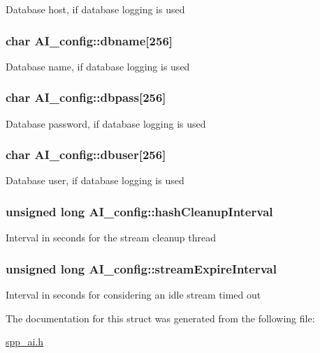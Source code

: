 \label{structAI__config_a8e56f1a1b2095d3d329c8068ea0f3aab}
Database host, if database logging is used \hypertarget{structAI__config_ac8a93607f12106e2f5c9b43af27107da}{
\subsubsection[{dbname}]{\setlength{\rightskip}{0pt plus 5cm}char {\bf AI\_\-config::dbname}\mbox{[}256\mbox{]}}}
\label{structAI__config_ac8a93607f12106e2f5c9b43af27107da}
Database name, if database logging is used \hypertarget{structAI__config_aa1cda349763faf60b2ebdbf2d187ae7d}{
\subsubsection[{dbpass}]{\setlength{\rightskip}{0pt plus 5cm}char {\bf AI\_\-config::dbpass}\mbox{[}256\mbox{]}}}
\label{structAI__config_aa1cda349763faf60b2ebdbf2d187ae7d}
Database password, if database logging is used \hypertarget{structAI__config_aa004adebfdafb6d14092aecd7f4912b0}{
\subsubsection[{dbuser}]{\setlength{\rightskip}{0pt plus 5cm}char {\bf AI\_\-config::dbuser}\mbox{[}256\mbox{]}}}
\label{structAI__config_aa004adebfdafb6d14092aecd7f4912b0}
Database user, if database logging is used \hypertarget{structAI__config_a9f7680615027d4fb74b4aa144a7028a4}{
\subsubsection[{hashCleanupInterval}]{\setlength{\rightskip}{0pt plus 5cm}unsigned long {\bf AI\_\-config::hashCleanupInterval}}}
\label{structAI__config_a9f7680615027d4fb74b4aa144a7028a4}
Interval in seconds for the stream cleanup thread \hypertarget{structAI__config_abbe77d5f94b8c5164bea47acba09c98b}{
\subsubsection[{streamExpireInterval}]{\setlength{\rightskip}{0pt plus 5cm}unsigned long {\bf AI\_\-config::streamExpireInterval}}}
\label{structAI__config_abbe77d5f94b8c5164bea47acba09c98b}
Interval in seconds for considering an idle stream timed out 

The documentation for this struct was generated from the following file:\begin{DoxyCompactItemize}
\item 
\hyperlink{spp__ai_8h}{spp\_\-ai.h}\end{DoxyCompactItemize}
